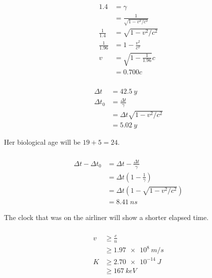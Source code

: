 \documentclass{article}
\begin{document}
\begin{align*}
  1.4            & = \gamma                         \\
                 & = \frac{1}{\sqrt{1 - v^2 / c^2}} \\
  \frac{1}{1.4}  & = \sqrt{1 - v^2 / c^2}           \\
  \frac{1}{1.96} & = 1 - \frac{v^2}{c^2}            \\
  v              & = \sqrt{1 - \frac{1}{1.96}} c    \\
                 & = 0.700 c
\end{align*}

\setcounter{subsubsection}{46}
\subsubsection{}

\begin{align*}
  \Delta t   & = \qty{42.5}{y}                 \\
  \Delta t_0 & = \frac{\Delta t}{\gamma}       \\
             & = \Delta t \sqrt{1 - v^2 / c^2} \\
             & = \qty{5.02}{y}
\end{align*}

Her biological age will be $19 + 5 = 24$.

\setcounter{subsubsection}{50}
\subsubsection{}

\begin{align*}
  \Delta t - \Delta t_0 & = \Delta t - \frac{\Delta t}{\gamma}           \\
                        & = \Delta t \left( 1 - \frac{1}{\gamma} \right) \\
                        & = \Delta t (1 - \sqrt{1 - v^2 / c^2})          \\
                        & = \qty{8.41}{ns}
\end{align*}

The clock that was on the airliner will show a shorter elapsed time.

\setcounter{subsubsection}{52}
\subsubsection{}

\begin{align*}
  v & \ge \frac{c}{n}       \\
    & \ge \qty{1.97e8}{m/s} \\
  K & \ge \qty{2.70e-14}{J} \\
    & \ge \qty{167}{keV}
\end{align*}
\end{document}
